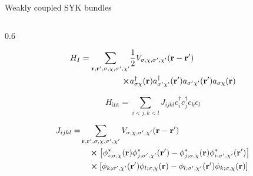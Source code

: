 \begin{frame}{Weakly coupled SYK bundles}
\begin{columns}
\begin{column}{0.6\textwidth}
\begin{block}{}
    \begin{equation*}
    \begin{aligned}
        H_{I} = \sum_{\mathbf{r}, \mathbf{r}', \sigma, \chi, \sigma', \chi'} & \frac{1}{2} V_{\sigma, \chi, \sigma', \chi'}(\mathbf{r} - \mathbf{r}') \\
        \cross & a^{\dagger}_{\sigma \chi}(\mathbf{r}) a^{\dagger}_{\sigma' \chi'}(\mathbf{r}') a_{\sigma' \chi'}(\mathbf{r}') a_{\sigma \chi}(\mathbf{r})
    \end{aligned}
    \end{equation*}
    
\end{block}

\begin{block}{}
    \begin{equation*} \label{flatband}
        H_{\mathrm{int}} = \sum_{i<j,k<l} J_{ijkl} c_{i}^{\dagger} c_{j}^{\dagger} c_{k} c_{l}
    \end{equation*}
    
    \begin{equation*}
    \begin{aligned}
        J_{ijkl} = & \sum_{\mathbf{r}, \mathbf{r}', \sigma, \chi, \sigma', \chi'} V_{\sigma, \chi, \sigma', \chi'}(\mathbf{r} - \mathbf{r}') \\
        &\quad \cross \left[ \phi^*_{i; \sigma, \chi}(\mathbf{r}) \phi^*_{j; \sigma', \chi'}(\mathbf{r}') - \phi^*_{j; \sigma, \chi}(\mathbf{r}) \phi^*_{i; \sigma', \chi'}(\mathbf{r}') \right] \\
        &\quad \cross \left[ \phi_{k; \sigma', \chi'}(\mathbf{r}') \phi_{l; \sigma, \chi}(\mathbf{r}) - \phi_{l; \sigma', \chi'}(\mathbf{r}') \phi_{k; \sigma, \chi}(\mathbf{r}) \right]
    \end{aligned}
    \end{equation*}
\end{block}
\end{column}


\end{columns}
\end{frame}
